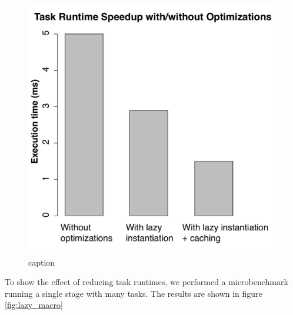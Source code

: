 \begin{figure}[t!]
 \begin{center}
   \includegraphics[scale=0.45]{images_graphs/optimizations/graph3/runtime_optimizations.pdf}
 \end{center}
 \caption{caption}
 \label{fig:runtime_optimizations}
\end{figure}

To show the effect of reducing task runtimes, we performed a microbenchmark running a single stage with many tasks. The results are shown in figure \ref{fig:lazy_macro}

